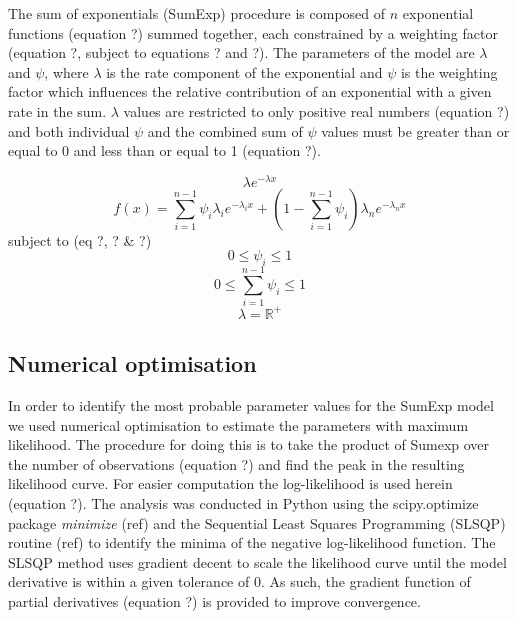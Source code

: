 \documentclass[11pt,usenames,dvipsnames]{article}
\begin{document}
The sum of exponentials (SumExp) procedure is composed of $n$ exponential functions (equation ?) summed together, each constrained by a weighting factor (equation ?, subject to equations ? and ?). The parameters of the model are $\lambda$ and $\psi$, where $\lambda$ is the rate component of the exponential and $\psi$ is the weighting factor which influences the relative contribution of an exponential with a given rate in the sum. $\lambda$ values are restricted to only positive real numbers (equation ?) and both individual $\psi$ and the combined sum of $\psi$ values must be greater than or equal to 0 and less than or equal to 1 (equation ?).

\begin{equation}
\lambda e^{-\lambda x}
\end{equation}
\begin{equation}
f(x) = \sum_{i=1}^{n-1} \psi_i \lambda_i e^{-\lambda_i x} + \left(1 - \sum_{i=1}^{n-1}\psi_i\right) \lambda_n e^{-\lambda_n x}
\end{equation}
subject to (eq ?, ? \& ?)
\begin{equation}
0\leq \psi_i \leq 1
\end{equation}
\begin{equation}
0\leq \sum_{i=1}^{n-1}\psi_i \leq 1
\end{equation}
\begin{equation}
\lambda = \mathbb{R}^+
\end{equation}

\subsection{Numerical optimisation}

In order to identify the most probable parameter values for the SumExp model we used numerical optimisation to estimate the parameters with maximum likelihood. The procedure for doing this is to take the product of Sumexp over the number of observations (equation ?) and find the peak in the resulting likelihood curve. For easier computation the log-likelihood is used herein (equation ?). The analysis was conducted in Python using the scipy.optimize package \textit{minimize} (ref) and the Sequential Least Squares Programming (SLSQP) routine (ref) to identify the minima of the negative log-likelihood function. The SLSQP method uses gradient decent to scale the likelihood curve until the model derivative is within a given tolerance of 0. As such, the gradient function of partial derivatives (equation ?) is provided to improve convergence.
\end{document}
